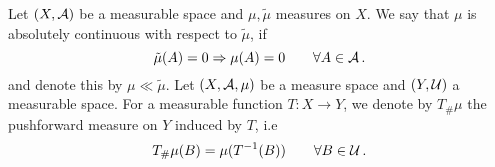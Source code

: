 \documentclass[
     12pt,         %
     a4paper,      %
     BCOR=10mm,     %
     DIV=14,        %
     ]{scrreprt}
\begin{document}
%
%
%
    
    \noindent Let $(X, \operatorname{\mathcal{A}})$ be a measurable space and $\mu, \tilde \mu$ measures on $X$.  We say that $\mu$ is absolutely continuous with respect to $\tilde \mu$, if
    \[\tilde \mu(A) = 0 \Rightarrow \mu(A) = 0 \quad \quad  \forall A\in \operatorname{\mathcal{A}}. \]
    and denote this by $\mu \ll \tilde \mu$.
    Let $(X, \operatorname{\mathcal{A}}, \mu)$ be a measure space and $(Y, \operatorname{\mathcal{U}})$ a measurable space. For a measurable function $T: X \to Y $, 
    we denote by $T_{\#}\mu$ the pushforward measure on $Y$ induced by $T$, i.e
    \[T_{\#}\mu(B) = \mu(T^{-1}(B)) \quad \quad \forall B \in \operatorname{\mathcal{U}}. \]
%
%    
    \TODO{}
\end{document}
